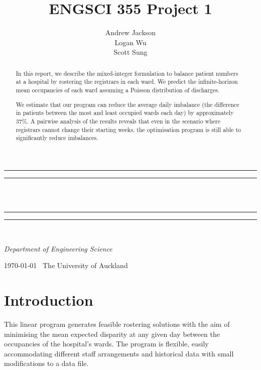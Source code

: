 \documentclass[a4paper]{article}
\title{ENGSCI 355 Project 1}
\author{Andrew Jackson\\Logan Wu\\Scott Sung}
\newlength{\drop}
\begin{document}
\begin{titlepage}
    \textheight
    \centering
    \vspace*{\baselineskip}
    \rule{\textwidth}{1.6pt}\vspace*{-\baselineskip}\vspace*{2pt}
    \rule{\textwidth}{0.4pt}\\[\baselineskip]
    {\LARGE \@title}\\[0.2\baselineskip]
    \rule{\textwidth}{0.4pt}\vspace*{-\baselineskip}\vspace{3.2pt}
    \rule{\textwidth}{1.6pt}\\[\baselineskip]
    \vspace*{2\baselineskip}
    {\Large \textsc{\@author}\par}
    {\itshape Department of Engineering Science\par}
    \vspace*{2\baselineskip}
    {\scshape \today} \        {\large The University of Auckland}\par
    \vspace{\fill}
    \begin{abstract}
    In this report, we describe the mixed-integer formulation to balance patient numbers at a hospital by rostering the registrars in each ward. We predict the infinite-horizon mean occupancies of each ward assuming a Poisson distribution of discharges.
    
We estimate that our program can reduce the average daily imbalance (the difference in patients between the most and least occupied wards each day) by approximately 37\%. A pairwise analysis of the results reveals that even in the scenario where registrars cannot change their starting weeks, the optimisation program is still able to significantly reduce imbalances.
    \end{abstract}
    \vspace{\fill}
\end{titlepage}
\makeatother
\pagestyle{fancy}

\section{Introduction}

This linear program generates feasible rostering solutions with the aim of minimising the mean expected disparity at any given day between the occupancies of the hospital's wards. The program is flexible, easily accommodating different staff arrangements and historical data with small modifications to a data file.
\end{document}
